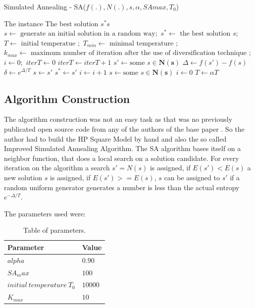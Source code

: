 \documentclass[10pt]{article}
\begin{document}
\begin{algorithm}
\caption{Simulated Annealing - SA($f(.), N(.), s, \alpha, SAmax, T_{0} $)}\label{alg:cap}
\begin{algorithmic}
\Require The instance
\Ensure The best solution $s^*s$
\State $s \gets \text{ generate an initial solution in a random way};$
\State $s^* \gets \text{ the best solution } s;$
\State $T \gets \text{ initial temperatue };$
\State $T_{min} \gets \text{ minimal temperature };$
\State $k_{max} \gets \text{ maximum number of iteration after the use of diversification technique };$
\State $i \gets 0;$
\State $iterT \gets 0$
        \State $iterT \gets iterT + 1$
        \State $s' \gets \text{some } s \in \mathbf{N(s)}$
        \State $\Delta \gets f(s') - f(s)$
        \State $\delta \gets e^{\Delta / T}$ 
            \State $s \gets s'$
        \EndIf
            \State $s^* \gets s'$
        \Else
            \State $i \gets i + 1$
        \EndIf
            \State $s \gets \text{some } s \in \mathbf{N(s)}$
            \State $i \gets 0$
        \EndIf
        \State $T \gets \alpha T$
    \EndWhile
\EndWhile
\end{algorithmic}
\end{algorithm}

\subsection{Algorithm Construction}

The algorithm construction was not an easy task as that was no previously publicated open source code from any of the authors of the base paper \cite{SaInPFP}. So the author had to build the HP Square Model by hand and also the so called Improved Simulated Annealing Algorithm. The SA algorithm bases itself on a neighbor function, that does a local search on a solution candidate. For every iteration on the algorithm a search $s' = N(s)$ is assigned, if $E(s') < E(s)$ a new solution $s$ is assigned, if $E(s') >= E(s)$, $s$ can be assigned to $s'$ if a random uniform generator generates a number is less than the actual entropy $e^{-\Delta / T}$. 

The parameters used were:

\begin{table}[!htb]
\centering
\begin{tabularx}{1.0\textwidth}{ C | C }
\toprule
Parameter & Value \\ 
\midrule
$alpha$ & $0.90$ \\
$SA{_max} $ & $100$\\
$initial~temperature~T_0$ & $10000$\\
$K_{max}$ & $10$\\
\bottomrule
\end{tabularx}
\label{table:tab1}
\caption{Table of parameters.}
\end{table}
\end{document}
